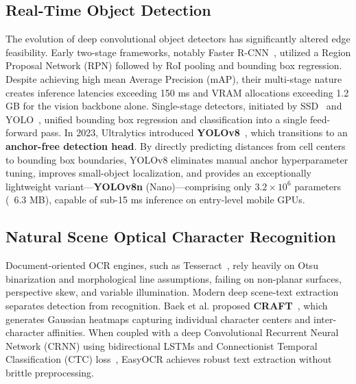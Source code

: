 \documentclass[conference]{IEEEtran}
\begin{document}
\subsection{Real-Time Object Detection}
The evolution of deep convolutional object detectors has significantly altered edge feasibility. Early two-stage frameworks, notably Faster R-CNN~\cite{ref:fasterrcnn}, utilized a Region Proposal Network (RPN) followed by RoI pooling and bounding box regression. Despite achieving high mean Average Precision (mAP), their multi-stage nature creates inference latencies exceeding 150 ms and VRAM allocations exceeding 1.2 GB for the vision backbone alone. Single-stage detectors, initiated by SSD~\cite{ref:ssd} and YOLO~\cite{ref:yolo}, unified bounding box regression and classification into a single feed-forward pass. In 2023, Ultralytics introduced \textbf{YOLOv8}~\cite{ref:yolov8}, which transitions to an \textbf{anchor-free detection head}. By directly predicting distances from cell centers to bounding box boundaries, YOLOv8 eliminates manual anchor hyperparameter tuning, improves small-object localization, and provides an exceptionally lightweight variant---\textbf{YOLOv8n} (Nano)---comprising only $3.2 \times 10^6$ parameters (~6.3 MB), capable of sub-15 ms inference on entry-level mobile GPUs.

\subsection{Natural Scene Optical Character Recognition}
Document-oriented OCR engines, such as Tesseract~\cite{ref:tesseract}, rely heavily on Otsu binarization and morphological line assumptions, failing on non-planar surfaces, perspective skew, and variable illumination. Modern deep scene-text extraction separates detection from recognition. Baek et al. proposed \textbf{CRAFT}~\cite{ref:craft}, which generates Gaussian heatmaps capturing individual character centers and inter-character affinities. When coupled with a deep Convolutional Recurrent Neural Network (CRNN) using bidirectional LSTMs and Connectionist Temporal Classification (CTC) loss~\cite{ref:crnn}, EasyOCR achieves robust text extraction without brittle preprocessing.
\end{document}
